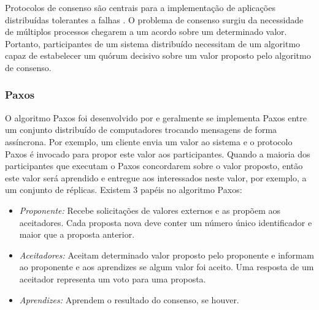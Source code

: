 Protocolos de consenso são centrais para a implementação de aplicações distribuídas tolerantes a falhas \cite{cason2017role}.
O problema de consenso surgiu da necessidade de múltiplos
processos chegarem a um acordo sobre um determinado valor. 
Portanto, participantes de um sistema distribuído
necessitam de
um algoritmo capaz de estabelecer 
um quórum decisivo sobre um valor proposto pelo algoritmo de consenso.


\subsubsection{Paxos}

O algoritmo Paxos foi desenvolvido por \textcite{lamport2001paxos} e geralmente se implementa Paxos entre um conjunto distribuído de computadores trocando mensagens de forma assíncrona. Por exemplo, um cliente envia um valor ao sistema e o protocolo Paxos é invocado para propor este valor aos participantes. Quando a maioria dos participantes que executam o Paxos concordarem sobre o valor proposto, então este valor será aprendido e entregue aos interessados neste valor, por exemplo, a um conjunto de réplicas. Existem 3 papéis no algoritmo Paxos:

\begin{itemize}
\item \textit{Proponente:} Recebe solicitações de valores externos e as propõem aos aceitadores. Cada proposta nova deve conter um número único identificador e maior que a proposta anterior.

\item \textit{Aceitadores:} Aceitam determinado valor proposto pelo proponente e informam ao proponente e aos aprendizes se algum valor foi aceito. Uma resposta de um aceitador representa um voto para uma proposta. 
\item \textit{Aprendizes:} Aprendem o resultado do consenso, se houver.
\end{itemize}

